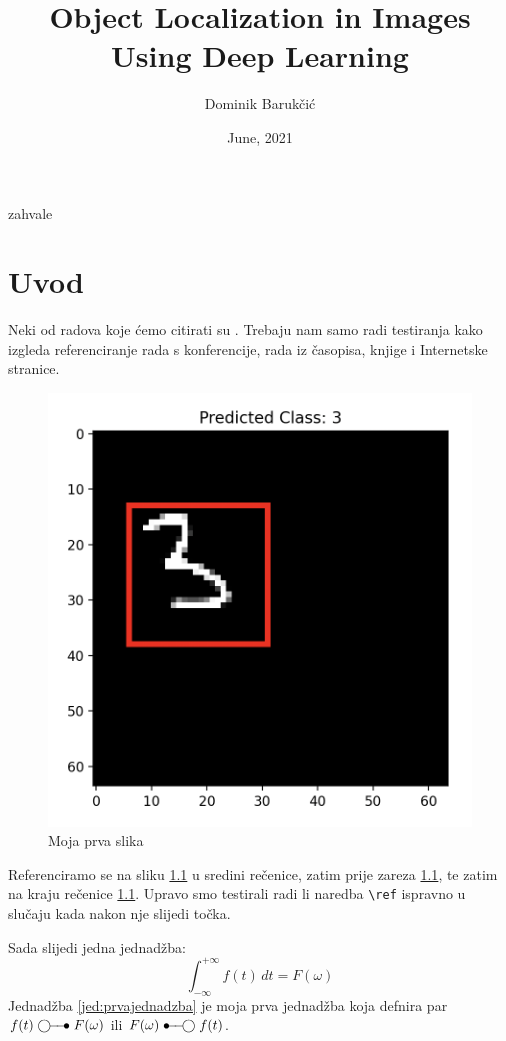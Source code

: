 \documentclass[zavrsnirad]{fer}
\title{Object Localization in Images Using Deep Learning}
\author{Dominik Barukčić}
\date{June, 2021}
\begin{document}
	\maketitle
	\begin{zahvale}
		zahvale
	\end{zahvale}
	\mainmatter
	\tableofcontents
	
	
	
	\chapter{Uvod}
	\label{pog:uvod}
	
	Neki od radova koje ćemo citirati su \cite{6248073,6247753,ghiglia_pritt_phase_unwrapping,hartley2003multiple,4250461,123DCatch}.
	Trebaju nam samo radi testiranja kako izgleda referenciranje rada s konferencije, rada iz časopisa, knjige i Internetske stranice.
	
	\begin{figure}[htb]
		\centering
		\includegraphics[width=0.38\linewidth]{Figures/primjer.png} 
		\caption{Moja prva slika}
		\label{slk:prvaslika}
	\end{figure}
	
	Referenciramo se na sliku \ref{slk:prvaslika} u sredini rečenice, zatim prije zareza \ref{slk:prvaslika}, te zatim na kraju rečenice \ref{slk:prvaslika}.
	Upravo smo testirali radi li naredba \verb|\ref| ispravno u slučaju kada nakon nje slijedi točka.
	
	Sada slijedi jedna jednadžba:
	\begin{equation}
		\label{jed:prvajednadzba}
		\int_{-\infty}^{+\infty}f(t)\,dt=F(\omega)
	\end{equation}
	Jednadžba \eqref{jed:prvajednadzba} je moja prva jednadžba koja defnira par $f(t)\ufrek F(\omega)$ ili $F(\omega)\uvrem f(t)$.
	
	
\end{document}
